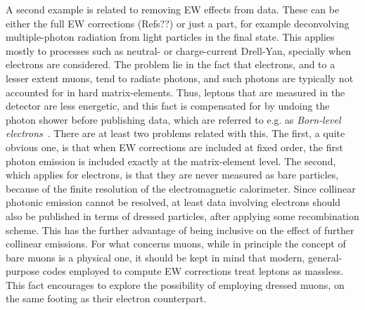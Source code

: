 A second example is related to removing EW effects from data. These can be either the full EW corrections (Refs??) 
or just a part, for example deconvolving multiple-photon radiation from light particles in the final state. This applies mostly
to processes such as neutral- or charge-current Drell-Yan, specially when electrons are considered. The problem lie in the fact that
 electrons, and to a lesser extent muons, tend to radiate photons, and such photons are typically not accounted
for in hard matrix-elements. Thus, leptons that are measured in the detector are less energetic, and this fact is compensated for
by undoing the photon shower before publishing data, which are referred to e.g. as \emph{Born-level electrons}~\cite{}. There are 
at least two 
problems related with this. The first, a quite obvious one, is that when EW corrections
are included at fixed order, the first photon emission is included exactly at the matrix-element level. The second, which
applies for electrons, is that they are never measured as bare particles, because of the finite resolution 
of the electromagnetic calorimeter. Since collinear photonic emission cannot be resolved, at least data 
involving electrons should also be published
in terms of dressed particles, after applying some recombination scheme. This has the further advantage of being 
inclusive on the effect of further collinear emissions. For what concerns muons, while in principle
the concept of bare muons is a physical one, it should be kept in mind that modern, general-purpose codes employed to
compute EW corrections treat leptons as massless. This fact encourages to explore the possibility of employing dressed
muons, on the same footing as their electron counterpart.
